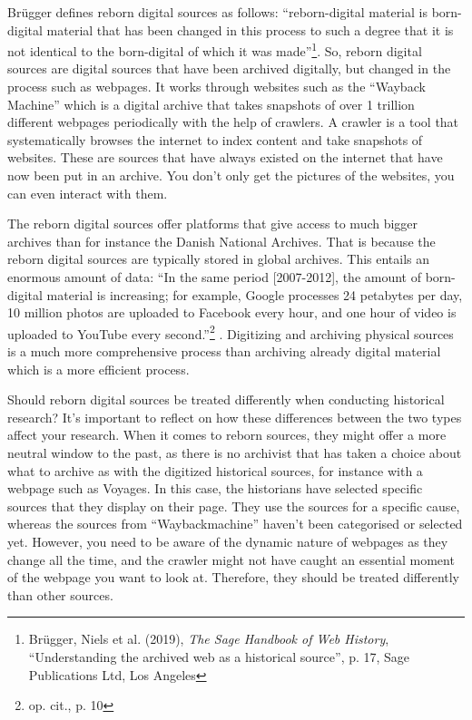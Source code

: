 \documentclass[%
  final,  %
  12pt,  %
  british,
  a4paper
]{article}
\begin{document}
Brügger defines reborn digital sources as follows: “reborn-digital material is born-digital material that has been changed in this process to such a degree that it is not identical to the born-digital of which it was made”\footnote{Brügger, Niels et al. (2019), \textit{The Sage Handbook of Web History}, “Understanding the archived web as a historical source”, p. 17, Sage Publications Ltd, Los Angeles}. So, reborn digital sources are digital sources that have been archived digitally, but changed in the process such as webpages. It works through websites such as the “Wayback Machine” which is a digital archive that takes snapshots of over 1 trillion different webpages periodically with the help of crawlers. A crawler is a tool that systematically browses the internet to index content and take snapshots of websites. These are sources that have always existed on the internet that have now been put in an archive. You don't only get the pictures of the websites, you can even interact with them.

The reborn digital sources offer platforms that give access to much bigger archives than for instance the Danish National Archives. That is because the reborn digital sources are typically stored in global archives. This entails an enormous amount of data: “In the same period [2007-2012], the amount of born-digital material is increasing; for example, Google processes 24 petabytes per day, 10 million photos are uploaded to Facebook every hour, and one hour of video is uploaded to YouTube every second.”\footnote{op. cit., p. 10} . Digitizing and archiving physical sources is a much more comprehensive process than archiving already digital material which is a more efficient process. 

Should reborn digital sources be treated differently when conducting historical research? It’s important to reflect on how these differences between the two types affect your research. When it comes to reborn sources, they might offer a more neutral window to the past, as there is no archivist that has taken a choice about what to archive as with the digitized historical sources, for instance with a webpage such as Voyages. In this case, the historians have selected specific sources that they display on their page. They use the sources for a specific cause, whereas the sources from “Waybackmachine” haven’t been categorised or selected yet. However, you need to be aware of the dynamic nature of webpages as they change all the time, and the crawler might not have caught an essential moment of the webpage you want to look at. Therefore, they should be treated differently than other sources.
\end{document}
